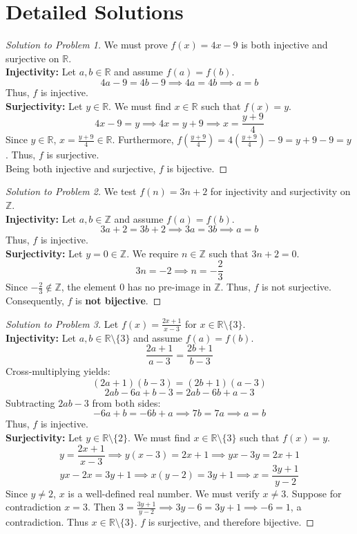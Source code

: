 \documentclass[11pt, letterpaper]{article}
\theoremstyle{definition}
\theoremstyle{remark}
\newcommand{\R}{\mathbb{R}}
\newcommand{\Z}{\mathbb{Z}}
\begin{document}
\newpage

\section{Detailed Solutions}

\begin{proof}[Solution to Problem 1]
We must prove $f(x) = 4x - 9$ is both injective and surjective on $\R$. \\
\textbf{Injectivity:} Let $a, b \in \R$ and assume $f(a) = f(b)$.
\[ 4a - 9 = 4b - 9 \implies 4a = 4b \implies a = b \]
Thus, $f$ is injective. \\
\textbf{Surjectivity:} Let $y \in \R$. We must find $x \in \R$ such that $f(x) = y$.
\[ 4x - 9 = y \implies 4x = y + 9 \implies x = \frac{y + 9}{4} \]
Since $y \in \R$, $x = \frac{y+9}{4} \in \R$. Furthermore, $f\left(\frac{y+9}{4}\right) = 4\left(\frac{y+9}{4}\right) - 9 = y + 9 - 9 = y$. Thus, $f$ is surjective. \\
Being both injective and surjective, $f$ is bijective.
\end{proof}

\begin{proof}[Solution to Problem 2]
We test $f(n) = 3n + 2$ for injectivity and surjectivity on $\Z$. \\
\textbf{Injectivity:} Let $a, b \in \Z$ and assume $f(a) = f(b)$.
\[ 3a + 2 = 3b + 2 \implies 3a = 3b \implies a = b \]
Thus, $f$ is injective. \\
\textbf{Surjectivity:} Let $y = 0 \in \Z$. We require $n \in \Z$ such that $3n + 2 = 0$.
\[ 3n = -2 \implies n = -\frac{2}{3} \]
Since $-\frac{2}{3} \notin \Z$, the element $0$ has no pre-image in $\Z$. Thus, $f$ is not surjective. \\
Consequently, $f$ is \textbf{not bijective}.
\end{proof}

\begin{proof}[Solution to Problem 3]
Let $f(x) = \frac{2x+1}{x-3}$ for $x \in \R \setminus \{3\}$. \\
\textbf{Injectivity:} Let $a, b \in \R \setminus \{3\}$ and assume $f(a) = f(b)$.
\[ \frac{2a+1}{a-3} = \frac{2b+1}{b-3} \]
Cross-multiplying yields:
\[ (2a+1)(b-3) = (2b+1)(a-3) \]
\[ 2ab - 6a + b - 3 = 2ab - 6b + a - 3 \]
Subtracting $2ab - 3$ from both sides:
\[ -6a + b = -6b + a \implies 7b = 7a \implies a = b \]
Thus, $f$ is injective. \\
\textbf{Surjectivity:} Let $y \in \R \setminus \{2\}$. We must find $x \in \R \setminus \{3\}$ such that $f(x) = y$.
\[ y = \frac{2x+1}{x-3} \implies y(x-3) = 2x+1 \implies yx - 3y = 2x + 1 \]
\[ yx - 2x = 3y + 1 \implies x(y-2) = 3y + 1 \implies x = \frac{3y+1}{y-2} \]
Since $y \neq 2$, $x$ is a well-defined real number. We must verify $x \neq 3$. Suppose for contradiction $x = 3$. Then $3 = \frac{3y+1}{y-2} \implies 3y - 6 = 3y + 1 \implies -6 = 1$, a contradiction. Thus $x \in \R \setminus \{3\}$. $f$ is surjective, and therefore bijective.
\end{proof}
\end{document}
